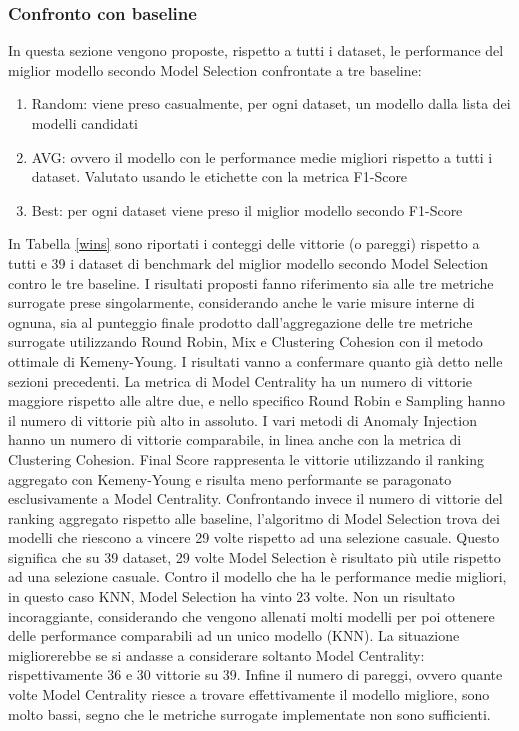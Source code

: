 \subsubsection{Confronto con baseline}
In questa sezione vengono proposte, rispetto a tutti i dataset, le performance del miglior modello secondo Model Selection confrontate a tre baseline:
\begin{enumerate}
\item Random: viene preso casualmente, per ogni dataset, un modello dalla lista dei modelli candidati
\item AVG: ovvero il modello con le performance medie migliori rispetto a tutti i dataset. Valutato usando le etichette con la metrica F1-Score
\item Best: per ogni dataset viene preso il miglior modello secondo F1-Score
\end{enumerate}
In Tabella \ref{wins} sono riportati i conteggi delle vittorie (o pareggi) rispetto a tutti e 39 i dataset di benchmark del miglior modello secondo Model Selection contro le tre baseline. I risultati proposti fanno riferimento sia alle tre metriche surrogate prese singolarmente, considerando anche le varie misure interne di ognuna, sia al punteggio finale prodotto dall'aggregazione delle tre metriche surrogate utilizzando Round Robin, Mix e Clustering Cohesion con il metodo ottimale di Kemeny-Young.
I risultati vanno a confermare quanto già detto nelle sezioni precedenti. La metrica di Model Centrality ha un numero di vittorie maggiore rispetto alle altre due, e nello specifico Round Robin e Sampling hanno il numero di vittorie più alto in assoluto.
I vari metodi di Anomaly Injection hanno un numero di vittorie comparabile, in linea anche con la metrica di Clustering Cohesion. Final Score rappresenta le vittorie utilizzando il ranking aggregato con Kemeny-Young e risulta meno performante se paragonato esclusivamente a Model Centrality.
Confrontando invece il numero di vittorie del ranking aggregato rispetto alle baseline, l'algoritmo di Model Selection trova dei modelli che riescono a vincere 29 volte rispetto ad una selezione casuale. Questo significa che su 39 dataset, 29 volte Model Selection è risultato più utile rispetto ad una selezione casuale. Contro il modello che ha le performance medie migliori, in questo caso KNN, Model Selection ha vinto 23 volte. Non un risultato incoraggiante, considerando che vengono allenati molti modelli per poi ottenere delle performance comparabili ad un unico modello (KNN). La situazione migliorerebbe se si andasse a considerare soltanto Model Centrality: rispettivamente 36 e 30 vittorie su 39.
Infine il numero di pareggi, ovvero quante volte Model Centrality riesce a trovare effettivamente il modello migliore, sono molto bassi, segno che le metriche surrogate implementate non sono sufficienti.

